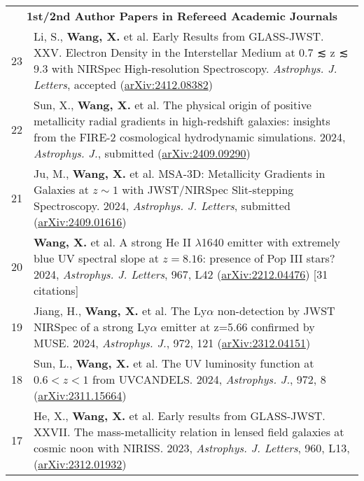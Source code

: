 \documentclass[letterpaper,10pt]{article}
\begin{document}
\begingroup
\renewcommand\arraystretch{1.2}
\vspace*{-.5em}
\begin{longtable}{rp{6.3in}}

\multicolumn{2}{c}{\textbf{1st/2nd Author Papers in Refereed Academic Journals}}      \\


23 & Li, S., \textbf{Wang, X.} et al. Early Results from GLASS-JWST. XXV. Electron Density in the Interstellar Medium at 0.7 ≲ z ≲ 9.3 with NIRSpec High-resolution Spectroscopy. \textit{Astrophys. J. Letters}, accepted (\href{https://arxiv.org/abs/2412.08382}{arXiv:2412.08382}) \\

22 & Sun, X., \textbf{Wang, X.} et al. The physical origin of positive metallicity radial gradients in high-redshift galaxies: insights from the FIRE-2 cosmological hydrodynamic simulations. 2024, \textit{Astrophys. J.}, submitted (\href{https://arxiv.org/abs/2409.09290}{arXiv:2409.09290}) \\

21 & Ju, M., \textbf{Wang, X.} et al. MSA-3D: Metallicity Gradients in Galaxies at $z\sim1$ with JWST/NIRSpec Slit-stepping Spectroscopy. 2024, \textit{Astrophys. J. Letters}, submitted (\href{https://arxiv.org/abs/2409.01616}{arXiv:2409.01616}) \\

20 &  \textbf{Wang, X.} et al. A strong He II $\lambda$1640 emitter with extremely blue UV spectral slope at $z=8.16$: presence of Pop III stars? 2024, \textit{Astrophys. J. Letters}, 967, L42 (\href{https://arxiv.org/abs/2212.04476}{arXiv:2212.04476}) [31 citations]  \\

19 & Jiang, H., \textbf{Wang, X.} et al. The Ly$\alpha$ non-detection by JWST NIRSpec of a strong Ly$\alpha$ emitter at z=5.66 confirmed by MUSE. 2024, \textit{Astrophys. J.}, 972, 121 (\href{https://arxiv.org/abs/2312.04151}{arXiv:2312.04151}) \\

18 & Sun, L., \textbf{Wang, X.} et al. The UV luminosity function at $0.6 < z < 1$ from UVCANDELS. 2024, \textit{Astrophys. J.}, 972, 8 (\href{https://arxiv.org/abs/2311.15664}{arXiv:2311.15664}) \\

17 & He, X., \textbf{Wang, X.} et al. Early results from GLASS-JWST. XXVII. The mass-metallicity relation in lensed field galaxies at cosmic noon with NIRISS. 2023, \textit{Astrophys. J. Letters}, 960, L13, (\href{https://arxiv.org/abs/2312.01932}{arXiv:2312.01932}) \\


\end{longtable}
\end{document}
